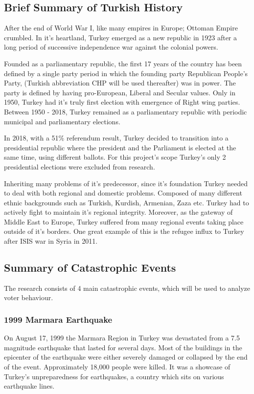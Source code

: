 \documentclass[12pt]{article}
\begin{document}
\subsection{Brief Summary of Turkish History}

After the end of World War I, like many empires in Europe; Ottoman Empire crumbled. In it's heartland, Turkey emerged as a new republic in 1923 after a long period of successive independence war against the colonial powers. 

Founded as a parliamentary republic, the first 17 years of the country has been defined by a single party period in which the founding party Republican People's Party, (Turkish abbreviation CHP will be used thereafter) was in power. The party is defined by having pro-European, Liberal and Secular values. Only in 1950, Turkey had it's truly first election with emergence of Right wing parties. Between 1950 - 2018, Turkey remained as a parliamentary republic with periodic municipal and parliamentary elections.

In 2018, with a 51\% referendum result, Turkey decided to transition into a presidential republic where the president and the Parliament is elected at the same time, using different ballots. For this project's scope Turkey's only 2 presidential elections were excluded from research. 

Inheriting many problems of it's predecessor, since it's foundation Turkey needed to deal with both regional and domestic problems. Composed of many different ethnic backgrounds such as Turkish, Kurdish, Armenian, Zaza etc. Turkey had to actively fight to maintain it's regional integrity. Moreover, as the gateway of Middle East to Europe, Turkey suffered from many regional events taking place outside of it's borders. One great example of this is the refugee influx to Turkey after ISIS war in Syria in 2011. 

\subsection{Summary of Catastrophic Events}

The research consists of 4 main catastrophic events, which will be used to analyze voter behaviour. 

\subsubsection{1999 Marmara Earthquake}
On August 17, 1999 the Marmara Region in Turkey was devastated from a 7.5 magnitude earthquake that lasted for several days. Most of the buildings in the epicenter of the earthquake were either severely damaged or collapsed by the end of the event. Approximately 18,000 people were killed. It was a showcase of Turkey's unpreparedness for earthquakes, a country which sits on various earthquake lines.
\end{document}
